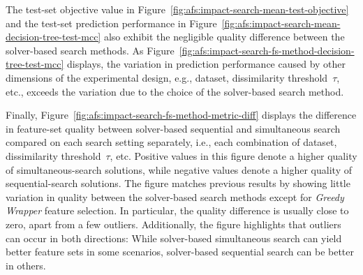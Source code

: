 \documentclass{article}
\theoremstyle{definition}
\begin{document}
The test-set objective value in Figure~\ref{fig:afs:impact-search-mean-test-objective} and the test-set prediction performance in Figure~\ref{fig:afs:impact-search-mean-decision-tree-test-mcc} also exhibit the negligible quality difference between the solver-based search methods.
As Figure~\ref{fig:afs:impact-search-fs-method-decision-tree-test-mcc} displays, the variation in prediction performance caused by other dimensions of the experimental design, e.g., dataset, dissimilarity threshold~$\tau$, etc., exceeds the variation due to the choice of the solver-based search method.

Finally, Figure~\ref{fig:afs:impact-search-fs-method-metric-diff} displays the difference in feature-set quality between solver-based sequential and simultaneous search compared on each search setting separately, i.e., each combination of dataset, dissimilarity threshold~$\tau$, etc.
Positive values in this figure denote a higher quality of simultaneous-search solutions, while negative values denote a higher quality of sequential-search solutions.
The figure matches previous results by showing little variation in quality between the solver-based search methods except for \emph{Greedy Wrapper} feature selection.
In particular, the quality difference is usually close to zero, apart from a few outliers.
Additionally, the figure highlights that outliers can occur in both directions:
While solver-based simultaneous search can yield better feature sets in some scenarios, solver-based sequential search can be better in others.
\end{document}
